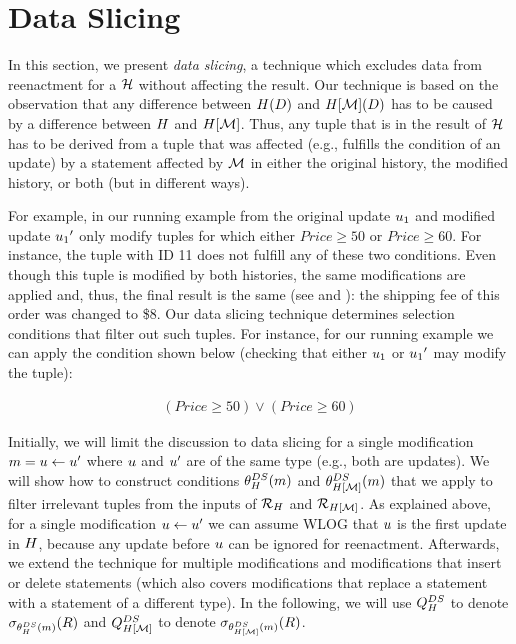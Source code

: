 
\section{Data Slicing}
\label{sec:filter}

In this section, we present \textit{data slicing}, a technique which excludes data from reenactment for a \abbrHW $\mathcal{H}$ without affecting the result. Our technique is based on the observation that any difference between $H(D)$ and $H[\mathcal{M}](D)$ has to be caused  by a difference between $H$ and $H[\mathcal{M}]$. Thus, any tuple that is in the result of $\mathcal{H}$ has to be derived from a tuple that was affected (e.g., fulfills the condition of an update) by a statement affected by $\mathcal{M}$ in either the original history, the modified history, or both (but in different ways).

For example, in our running example from  the original update $u_1$ and modified update ${u_1}'$ only modify tuples for which either $Price \geq 50$ or $Price \geq 60$. For instance, the tuple with ID 11 does not fulfill any of these two conditions. Even though this tuple is modified by both histories, the same modifications are applied and, thus, the final result is the same (see  and ): the shipping fee of this order was changed to \$8. Our data slicing technique determines selection conditions that filter out such tuples. For instance, for our running example we can apply the condition shown below (checking that either $u_1$ or ${u_1}'$ may modify the tuple):

  \begin{align*}
    (Price \geq 50) \lor (Price \geq 60)
  \end{align*}
  

Initially, we will limit the discussion to data slicing for a single modification $m = u \gets u'$ where $u$ and $u'$ are of the same type (e.g., both are updates). We will show how to construct conditions $\theta_{H}^{DS}(m)$ and $\theta_{H[\mathcal{M}]}^{DS}(m)$ that we apply to filter irrelevant tuples from the inputs of $\mathcal{R}_{H}$ and $\mathcal{R}_{H[\mathcal{M}]}$. As explained above, for a single modification $u \gets u'$  we can assume WLOG that $u$ is the first update in $H$, because any update before $u$ can be ignored for reenactment. Afterwards, we extend the technique for multiple modifications and modifications that insert or delete statements (which also covers modifications that replace a statement with a statement of a different type). In the following, we will use $Q_{H}^{DS}$ to denote $\sigma_{\theta_{H}^{DS}(m)}(R)$ and $Q_{H[\mathcal{M}]}^{DS}$ to denote $\sigma_{\theta_{H[\mathcal{M}]}^{DS}(m)}(R)$.













